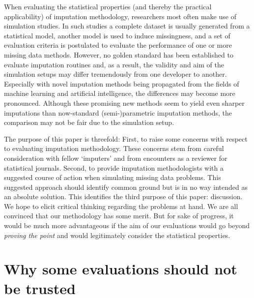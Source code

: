 \documentclass[bimj,fleqn]{w-art}
\begin{document}
When evaluating the statistical properties (and thereby the practical applicability) of imputation methodology, researchers most often make use of simulation studies. In such studies a complete dataset is usually generated from a statistical model, another model is used to induce missingness, and a set of evaluation criteria is postulated to evaluate the performance of one or more missing data methods. However, no golden standard has been established to evaluate imputation routines and, as a result, the validity and aim of the simulation setups may differ tremendously from one developer to another. Especially with novel imputation methods being propagated from the fields of machine learning and artificial intelligence, the differences may become more pronounced. Although these promising new methods seem to yield even sharper imputations than now-standard (semi-)parametric imputation methods, the comparison may not be fair due to the simulation setup. 


The purpose of this paper is threefold: First, to raise some concerns with respect to evaluating imputation methodology. These concerns stem from careful consideration with fellow `imputers' and from encounters as a reviewer for statistical journals. Second, to provide imputation methodologists with a suggested course of action when simulating missing data problems. This suggested approach should identify common ground but is in no way intended as an absolute solution. This identifies the third purpose of this paper: discussion. We hope to elicit critical thinking regarding the problems at hand. We are all convinced that our methodology has some merit. But for sake of progress, it would be much more advantageous if the aim of our evaluations would go beyond \textit{proving the point} and would legitimately consider the statistical properties. 



\section{Why some evaluations should not be trusted}
\end{document}

